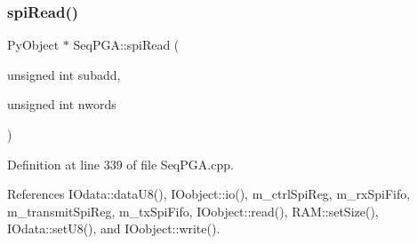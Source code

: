 \subsubsection{\texorpdfstring{spi\+Read()}{spiRead()}\hspace{0.1cm}{\footnotesize\ttfamily [2/3]}}
{\footnotesize\ttfamily Py\+Object $\ast$ Seq\+P\+G\+A\+::spi\+Read (\begin{DoxyParamCaption}\item[{unsigned int}]{subadd,  }\item[{unsigned int}]{nwords }\end{DoxyParamCaption})}



Definition at line 339 of file Seq\+P\+G\+A.\+cpp.



References I\+Odata\+::data\+U8(), I\+Oobject\+::io(), m\+\_\+ctrl\+Spi\+Reg, m\+\_\+rx\+Spi\+Fifo, m\+\_\+transmit\+Spi\+Reg, m\+\_\+tx\+Spi\+Fifo, I\+Oobject\+::read(), R\+A\+M\+::set\+Size(), I\+Odata\+::set\+U8(), and I\+Oobject\+::write().


